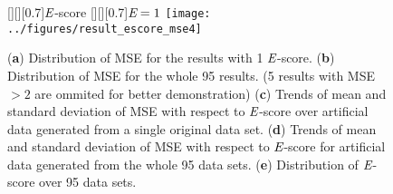 \begin{comment}
Figure~\ref{f:hdv-result-detail} shows the distribution of errors in predicted band locations over the position of residues in the HDV data set. This is to check if there is any systematic bias in band annotation on the residue position. The middle diagram represents the mapping between the reference band locations and those determined by the proposed method. The upper and lower plots show the position errors for the proposed method and FAST, respectively. For the proposed method, the errors near the start location tends to be larger than those in the middle. According to our experience, there exist very high-intensity bands in the starting and ending portion of a profile, which hinders even the manual band annotation. The larger error near these segments in a profile may be due to these high-intensity bands. The error pattern in the result from FAST shows a different pattern, and the largest errors appear near residues 40--50. Overall, the errors from the proposed method were consistently lower than those from FAST.


\begin{figure}
\centering
	\psfrag{r}[][][0.5]{$\rho$}
\texttt{[image: ../figures/result\_hdv\_result\_detail2]}
\caption{Error in band positions with respect to the reference band locations for 187-nt HDV data. Upper plot: error over residue positions for the proposed method; middle: mapping between the reference and computationally predicted band locations; lower: error over residue positions for FAST.}
\label{f:hdv-result-detail}
\end{figure}
\end{comment}


\begin{figure}
\centering
	[][][0.7]{${\emph{E}}$-score}
	[][][0.7]{${\emph{E}}=1$}
\texttt{[image: ../figures/result\_escore\_mse4]}
\caption{(\textbf{a}) Distribution of MSE for the results with 1 ${\emph{E}}$-score. (\textbf{b}) Distribution of MSE for the whole 95 results. (5 results with MSE $> 2$ are ommited for better demonstration) (\textbf{c}) Trends of mean and standard deviation of MSE with respect to ${\emph{E}}$-score over artificial data generated from a single original data set. (\textbf{d}) Trends of mean and standard deviation of MSE with respect to ${\emph{E}}$-score for artificial data generated from the whole 95 data sets. (\textbf{e}) Distribution of ${\emph{E}}$-score over 95 data sets.}
\label{f:escore-mse}
\end{figure}

